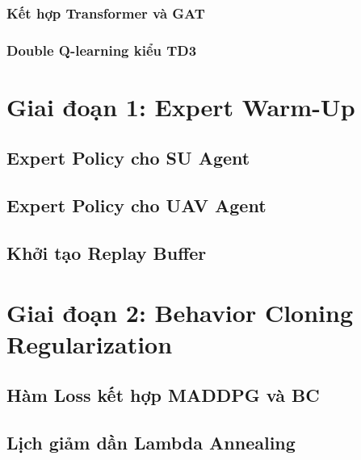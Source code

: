 \subsubsection{Kết hợp Transformer và GAT}
\label{subsubsec:alg:critic:combine}

\subsubsection{Double Q-learning kiểu TD3}
\label{subsubsec:alg:critic:double}

\section{Giai đoạn 1: Expert Warm-Up}
\label{sec:alg:warmup}

\subsection{Expert Policy cho SU Agent}
\label{subsec:alg:expert:su}

\subsection{Expert Policy cho UAV Agent}
\label{subsec:alg:expert:uav}

\subsection{Khởi tạo Replay Buffer}
\label{subsec:alg:expert:buffer}

\section{Giai đoạn 2: Behavior Cloning Regularization}
\label{sec:alg:bc}

\subsection{Hàm Loss kết hợp MADDPG và BC}
\label{subsec:alg:bc:loss}

\subsection{Lịch giảm dần Lambda Annealing}
\label{subsec:alg:bc:anneal}

